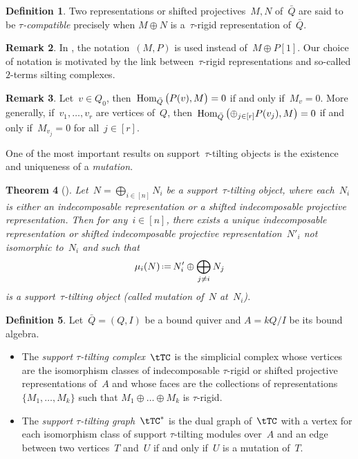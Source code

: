 \documentclass{amsart}
\newtheorem{theorem}{Theorem}[part]
\theoremstyle{definition}
\newtheorem{definition}[theorem]{Definition}
\newtheorem{remark}[theorem]{Remark}
\newcommand{\eqdef}{\mbox{\,\raisebox{0.2ex}{\scriptsize\ensuremath{\mathrm:}}\ensuremath{=}\,}} %
\newcommand{\darkblue}{\color{darkblue}} %
\newcommand{\defn}[1]{\textsl{\darkblue #1}} %
\newcommand{\Hom}[1]{\operatorname{{\rm Hom}}_{#1}}
\begin{document}
\begin{definition}\label{def: tau-compatibility}
 Two representations or shifted projectives~$M, N$ of~$\bar Q$ are said to be \defn{$\tau$-compatible} precisely when $M\oplus N$ is a~$\tau$-rigid representation of~$\bar Q$.
\end{definition}


\begin{remark}
In \cite{AdachiIyamaReiten}, the notation~$(M,P)$ is used instead of~$M\oplus P[1]$.  Our choice of notation is motivated by the link between~$\tau$-rigid representations and so-called $2$-terms silting complexes.
\end{remark}

\begin{remark}
Let~$v\in Q_0$, then~$\Hom{\bar Q} \big( P(v), M \big) = 0$ if and only if~$M_v=0$. More generally, if~$v_1, \ldots, v_r$ are vertices of~$Q$, then~$\Hom{\bar Q}\big( {\oplus_{j \in [r]} P(v_j)}, M \big) = 0$ if and only if~$M_{v_j}=0$ for all~$j \in [r]$. 
\end{remark}

One of the most important results on support~$\tau$-tilting objects is the existence and uniqueness of a \defn{mutation}.  

\begin{theorem}[\cite{AdachiIyamaReiten}]\label{thm:mutationstautilts}
Let~$N = \bigoplus_{i \in [n]} N_i$ be a support~$\tau$-tilting object, where each~$N_i$ is either an indecomposable representation or a shifted indecomposable projective representation.
Then for any~${i \in [n]}$, there exists a unique indecomposable representation or shifted indecomposable projective representation~$N'_i$ not isomorphic to~$N_i$ and such that
\[
\mu_i(N) \eqdef N'_i \oplus \bigoplus_{j\neq i} N_j
\]
is a support~$\tau$-tilting object (called mutation of~$N$ at~$N_i$).
\end{theorem}

\begin{definition}\label{def: stautilt complex}
Let~$\bar Q = (Q,I)$ be a bound quiver and $A = kQ/I$ be its bound algebra.
\begin{itemize}
\item The \defn{support $\tau$-tilting complex}~$\tTC$ is the simplicial complex whose vertices are the isomorphism classes of indecomposable $\tau$-rigid or shifted projective representations of~$A$ and whose faces are the collections of representations~$\{M_1, \dots, M_k\}$ such that $M_1 \oplus \dots \oplus M_k$ is $\tau$-rigid.
\item The \defn{support $\tau$-tilting graph}~$\tTC^*$ is the dual graph of~$\tTC$ with a vertex for each isomorphism class of support $\tau$-tilting modules over~$A$ and an edge between two vertices~$T$ and~$U$ if and only if~$U$ is a mutation of~$T$.
\end{itemize}
\end{definition}
\end{document}
